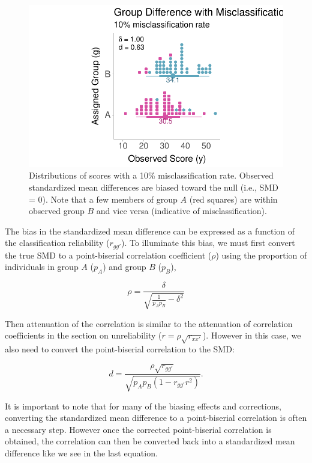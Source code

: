 \documentclass[
  letterpaper,
  DIV=11,
  numbers=noendperiod]{scrreprt}
\begin{document}
\begin{figure}

{\centering \includegraphics{misclassification_files/figure-pdf/fig-mis-1.pdf}

}

\caption{\label{fig-mis}Distributions of scores with a 10\%
misclassification rate. Observed standardized mean differences are
biased toward the null (i.e., SMD = 0). Note that a few members of group
\(A\) (red squares) are within observed group \(B\) and vice versa
(indicative of misclassification).}

\end{figure}

The bias in the standardized mean difference can be expressed as a
function of the classification reliability (\(r_{gg'}\)). To illuminate
this bias, we must first convert the true SMD to a point-biserial
correlation coefficient (\(\rho\)) using the proportion of individuals
in group \(A\) (\(p_A\)) and group \(B\) (\(p_B\)),

\[
\rho = \frac{\delta}{\sqrt{\frac{1}{p_Ap_B}-\delta^2}}
\]

Then attenuation of the correlation is similar to the attenuation of
correlation coefficients in the section on unreliability
(\(r = \rho\sqrt{r_{xx'}}\)). However in this case, we also need to
convert the point-biserial correlation to the SMD:

\[
d =\frac{ \rho \sqrt{r_{gg'}} }{\sqrt{p_A p_B\left(1- r_{gg'} r^2\right) }}.
\]

It is important to note that for many of the biasing effects and
corrections, converting the standardized mean difference to a
point-biserial correlation is often a necessary step. However once the
corrected point-biserial correlation is obtained, the correlation can
then be converted back into a standardized mean difference like we see
in the last equation.
\end{document}
